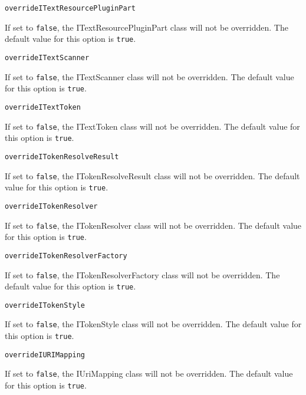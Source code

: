 \noindent\texttt{overrideITextResourcePluginPart}
\begin{myindentpar}{1cm}
If set to \texttt{false}, the ITextResourcePluginPart class will not be overridden. The default value for this option is \texttt{true}.
\end{myindentpar}

\noindent\texttt{overrideITextScanner}
\begin{myindentpar}{1cm}
If set to \texttt{false}, the ITextScanner class will not be overridden. The default value for this option is \texttt{true}.
\end{myindentpar}

\noindent\texttt{overrideITextToken}
\begin{myindentpar}{1cm}
If set to \texttt{false}, the ITextToken class will not be overridden. The default value for this option is \texttt{true}.
\end{myindentpar}

\noindent\texttt{overrideITokenResolveResult}
\begin{myindentpar}{1cm}
If set to \texttt{false}, the ITokenResolveResult class will not be overridden. The default value for this option is \texttt{true}.
\end{myindentpar}

\noindent\texttt{overrideITokenResolver}
\begin{myindentpar}{1cm}
If set to \texttt{false}, the ITokenResolver class will not be overridden. The default value for this option is \texttt{true}.
\end{myindentpar}

\noindent\texttt{overrideITokenResolverFactory}
\begin{myindentpar}{1cm}
If set to \texttt{false}, the ITokenResolverFactory class will not be overridden. The default value for this option is \texttt{true}.
\end{myindentpar}

\noindent\texttt{overrideITokenStyle}
\begin{myindentpar}{1cm}
If set to \texttt{false}, the ITokenStyle class will not be overridden. The default value for this option is \texttt{true}.
\end{myindentpar}

\noindent\texttt{overrideIURIMapping}
\begin{myindentpar}{1cm}
If set to \texttt{false}, the IUriMapping class will not be overridden. The default value for this option is \texttt{true}.
\end{myindentpar}

